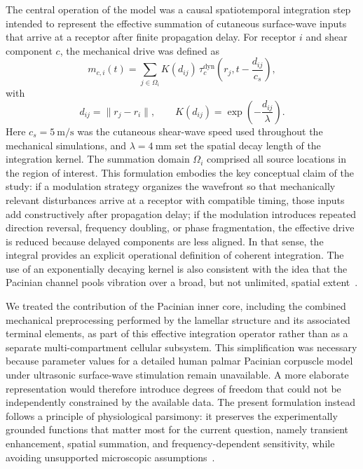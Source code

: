 \documentclass[pdflatex, sn-nature]{sn-jnl}
\theoremstyle{thmstyleone}%
\theoremstyle{thmstyletwo}%
\theoremstyle{thmstylethree}%
\begin{document}
The central operation of the model was a causal spatiotemporal integration step intended to represent the effective summation of cutaneous surface-wave inputs that arrive at a receptor after finite propagation delay. For receptor $i$ and shear component $c$, the mechanical drive was defined as
\begin{equation}
    m_{c,i}(t)=\sum_{j \in \Omega_i} K(d_{ij})\,\tau^{\mathrm{dyn}}_{c}\!\left(r_j, t-\frac{d_{ij}}{c_s}\right),
\end{equation}
with
\begin{equation}
    d_{ij}=\lVert r_j-r_i \rVert,
    \qquad
    K(d_{ij})=\exp\!\left(-\frac{d_{ij}}{\lambda}\right).
\end{equation}
Here $c_s=\qty{5}{\meter\per\second}$ was the cutaneous shear-wave speed used throughout the mechanical simulations, and $\lambda=\qty{4}{\milli\meter}$ set the spatial decay length of the integration kernel. The summation domain $\Omega_i$ comprised all source locations in the region of interest. This formulation embodies the key conceptual claim of the study: if a modulation strategy organizes the wavefront so that mechanically relevant disturbances arrive at a receptor with compatible timing, those inputs add constructively after propagation delay; if the modulation introduces repeated direction reversal, frequency doubling, or phase fragmentation, the effective drive is reduced because delayed components are less aligned. In that sense, the integral provides an explicit operational definition of coherent integration. The use of an exponentially decaying kernel is also consistent with the idea that the Pacinian channel pools vibration over a broad, but not unlimited, spatial extent~\citep{loewensteinMechanicalTransmissionPacinian1966, verrilloEffectContactorArea1963, saalSimulatingTactileSignals2017}.

We treated the contribution of the Pacinian inner core, including the combined mechanical preprocessing performed by the lamellar structure and its associated terminal elements, as part of this effective integration operator rather than as a separate multi-compartment cellular subsystem. This simplification was necessary because parameter values for a detailed human palmar Pacinian corpuscle model under ultrasonic surface-wave stimulation remain unavailable. A more elaborate representation would therefore introduce degrees of freedom that could not be independently constrained by the available data. The present formulation instead follows a principle of physiological parsimony: it preserves the experimentally grounded functions that matter most for the current question, namely transient enhancement, spatial summation, and frequency-dependent sensitivity, while avoiding unsupported microscopic assumptions~\citep{loewensteinMechanicalTransmissionPacinian1966, quindlenMultiphysicsModelPacinian2016, ziolkowskiInnerCoreEnables2025}.
\end{document}
